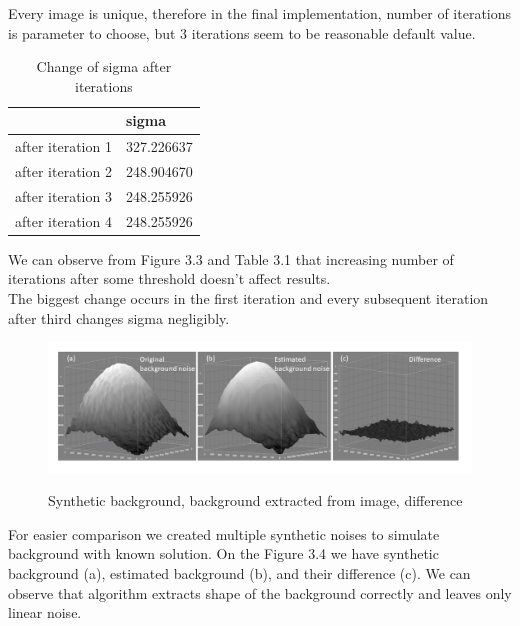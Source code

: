 \documentclass[12pt, a4paper, oneside]{book}
\begin{document}
Every image is unique, therefore in the final implementation, number of iterations is parameter to choose, but 3 iterations seem to be reasonable default value.


\begin{table}[H]
    \centering
\begin{tabular}{|l|l|}
\hline
                  & sigma               \\ \hline
after iteration 1 & 327.226637 \\ \hline
after iteration 2 & 248.904670 \\ \hline
after iteration 3 & 248.255926 \\ \hline
after iteration 4 & 248.255926 \\ \hline
\end{tabular}
    \caption{Change of sigma after iterations}
    \label{tab:sigma}
\end{table}

We can observe from Figure 3.3 and Table 3.1 that increasing number of iterations after some threshold doesn't affect results.\\
The biggest change occurs in the first iteration and every subsequent iteration after third changes sigma negligibly.\\

\begin{figure}[H]
    \begin{center}
        \includegraphics[scale=1.20]{images/sigmaclip_difference.png}
        \label{img:background_result}
        \caption{Synthetic background, background extracted from image, difference \cite{silhaetal}}
    \end{center}
\end{figure}

For easier comparison we created multiple synthetic noises to simulate background with known solution.
On the Figure 3.4 we have synthetic background (a), estimated background (b), and their difference (c).
We can observe that algorithm extracts shape of the background correctly and leaves only linear noise.
\end{document}
